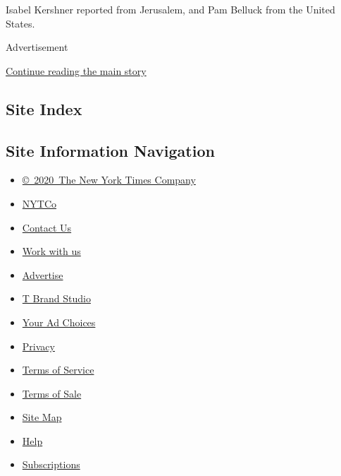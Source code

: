 Isabel Kershner reported from Jerusalem, and Pam Belluck from the United
States.

Advertisement

\protect\hyperlink{after-bottom}{Continue reading the main story}

\hypertarget{site-index}{%
\subsection{Site Index}\label{site-index}}

\hypertarget{site-information-navigation}{%
\subsection{Site Information
Navigation}\label{site-information-navigation}}

\begin{itemize}
\tightlist
\item
  \href{https://help.nytimes3xbfgragh.onion/hc/en-us/articles/115014792127-Copyright-notice}{©~2020~The
  New York Times Company}
\end{itemize}

\begin{itemize}
\tightlist
\item
  \href{https://www.nytco.com/}{NYTCo}
\item
  \href{https://help.nytimes3xbfgragh.onion/hc/en-us/articles/115015385887-Contact-Us}{Contact
  Us}
\item
  \href{https://www.nytco.com/careers/}{Work with us}
\item
  \href{https://nytmediakit.com/}{Advertise}
\item
  \href{http://www.tbrandstudio.com/}{T Brand Studio}
\item
  \href{https://www.nytimes3xbfgragh.onion/privacy/cookie-policy\#how-do-i-manage-trackers}{Your
  Ad Choices}
\item
  \href{https://www.nytimes3xbfgragh.onion/privacy}{Privacy}
\item
  \href{https://help.nytimes3xbfgragh.onion/hc/en-us/articles/115014893428-Terms-of-service}{Terms
  of Service}
\item
  \href{https://help.nytimes3xbfgragh.onion/hc/en-us/articles/115014893968-Terms-of-sale}{Terms
  of Sale}
\item
  \href{https://spiderbites.nytimes3xbfgragh.onion}{Site Map}
\item
  \href{https://help.nytimes3xbfgragh.onion/hc/en-us}{Help}
\item
  \href{https://www.nytimes3xbfgragh.onion/subscription?campaignId=37WXW}{Subscriptions}
\end{itemize}
